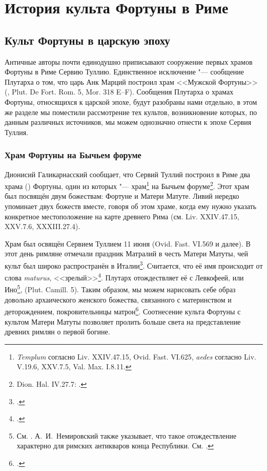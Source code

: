 \chapter{История культа Фортуны в Риме}

\section{Культ Фортуны в царскую эпоху}

Античные авторы почти единодушно приписывают сооружение первых храмов Фортуны в Риме Сервию Туллию. Единственное исключение "--- сообщение Плутарха о том, что царь Анк Марций построил храм <<Мужской Фортуны>> (, Plut. De Fort. Rom. 5, Mor. 318 E--F). Сообщения Плутарха о храмах Фортуны, относящихся к царской эпохе, будут разобраны нами отдельно, в этом же разделе мы поместили рассмотрение тех культов, возникновение которых, по данным различных источников, мы можем однозначно отнести к эпохе Сервия Туллия.

\subsection{Храм Фортуны на Бычьем форуме}\label{FortunaInForoBoario}

Дионисий Галикарнасский сообщает, что Сервий Туллий построил в Риме два храма () Фортуны, один из которых "--- храм\footnote{\textit{Templum} согласно Liv. XXIV.47.15, Ovid. Fast. VI.625, \textit{aedes} согласно Liv. V.19.6, XXV.7.5, Val. Max. I.8.11.} на Бычьем форуме\footnote{Dion. Hal. IV.27.7: .}. Этот храм был посвящён двум божествам: Фортуне и Матери Матуте. Ливий нередко упоминает двух божеств вместе, говоря об этом храме, когда ему нужно указать конкретное местоположение на карте древнего Рима (см. Liv. XXIV.47.15, XXV.7.6, XXXIII.27.4). 


Храм был освящён Сервием Туллием 11 июня (Ovid. Fast. VI.569 и далее). В этот день римляне отмечали праздник Матралий в честь Матери Матуты, чей культ был широко распространён в Италии\footcites[Pp. 154--157]{Fowler1899}[Pp. 150--151]{Scullard1981}. Считается, что её имя происходит от слова \textit{maturus}, <<зрелый>>\footcite[S. 88]{Latte1960}. Плутарх отождествляет её с Левкофеей, или Ино\footnote{См. \cites[P. 154]{Fowler1899}[P. 154]{Latte1960}. А.~И.~Немировский также указывает, что такое отождествление характерно для римских антикваров конца Республики. См. \cite[С. 75--76]{Nemirovsky1964}.}, (Plut. Camill. 5). Таким образом, мы можем нарисовать себе образ довольно архаического женского божества, связанного с материнством и деторождением, покровительницы матрон\footcites[P. 155]{Fowler1899}[P. 150]{Scullard1981}. Соотнесение культа Фортуны с культом Матери Матуты позволяет пролить больше света на представление древних римлян о первой богине.


